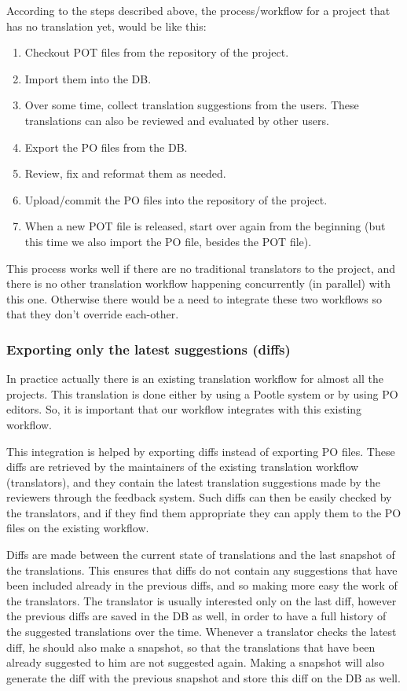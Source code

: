 \documentclass[11pt]{article}
\begin{document}
    According to the steps described above, the process/workflow for a
    project that has no translation yet, would be like this:
\begin{enumerate}
\item Checkout POT files from the repository of the project.
\item Import them into the DB.
\item Over some time, collect translation suggestions from the users.
       These translations can also be reviewed and evaluated by other
       users.
\item Export the PO files from the DB.
\item Review, fix and reformat them as needed.
\item Upload/commit the PO files into the repository of the project.
\item When a new POT file is released, start over again from the
       beginning (but this time we also import the PO file, besides the
       POT file).
\end{enumerate}
    This process works well if there are no traditional translators to
    the project, and there is no other translation workflow happening
    concurrently (in parallel) with this one. Otherwise there would be
    a need to integrate these two workflows so that they don't override
    each-other.

\subsubsection{Exporting only the latest suggestions (diffs)}
\label{sec-8.2.5}


    In practice actually there is an existing translation workflow for
    almost all the projects. This translation is done either by using a
    Pootle system or by using PO editors. So, it is important that our
    workflow integrates with this existing workflow.

    This integration is helped by exporting diffs instead of exporting
    PO files. These diffs are retrieved by the maintainers of the
    existing translation workflow (translators), and they contain the
    latest translation suggestions made by the reviewers through the
    feedback system. Such diffs can then be easily checked by the
    translators, and if they find them appropriate they can apply them
    to the PO files on the existing workflow.

    Diffs are made between the current state of translations and the
    last snapshot of the translations. This ensures that diffs do not
    contain any suggestions that have been included already in the
    previous diffs, and so making more easy the work of the
    translators. The translator is usually interested only on the last
    diff, however the previous diffs are saved in the DB as well, in
    order to have a full history of the suggested translations over the
    time. Whenever a translator checks the latest diff, he should also
    make a snapshot, so that the translations that have been already
    suggested to him are not suggested again. Making a snapshot will
    also generate the diff with the previous snapshot and store this
    diff on the DB as well.
\end{document}
